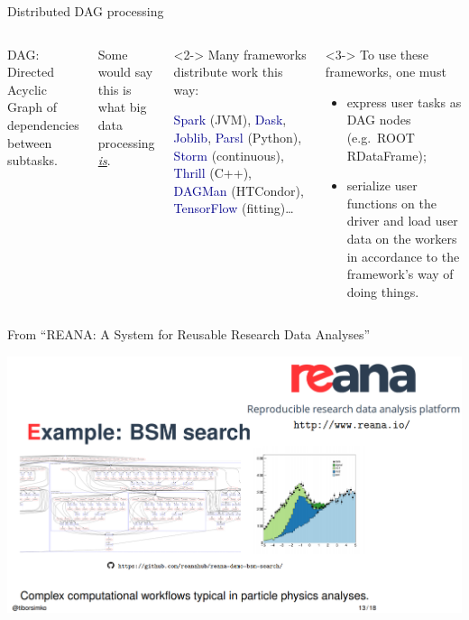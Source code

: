 \documentclass[aspectratio=169]{beamer}
\begin{document}
\begin{frame}{Distributed DAG processing}
\begin{columns}
DAG: Directed Acyclic Graph of dependencies between subtasks.

Some would say this is what big data processing \underline{\it is}.

\vspace{0.5 cm}
\begin{uncoverenv}<2->
Many frameworks distribute work this way:

\vspace{0.2 cm}
\hfill \begin{minipage}{0.95\linewidth}
\textcolor{darkblue}{Spark} (JVM), \textcolor{darkblue}{Dask}, \textcolor{darkblue}{Joblib}, \textcolor{darkblue}{Parsl} (Python), \textcolor{darkblue}{Storm} (continuous), \textcolor{darkblue}{Thrill} (C++), \textcolor{darkblue}{DAGMan} (HTCondor), \textcolor{darkblue}{TensorFlow} (fitting)\ldots
\end{minipage}
\end{uncoverenv}

\vspace{0.5 cm}
\begin{uncoverenv}<3->
To use these frameworks, one must
\begin{itemize}
\item express user tasks as DAG nodes (e.g.\ ROOT RDataFrame);
\item serialize user functions on the driver and load user data on the workers in accordance to the framework's way of doing things.
\end{itemize}
\end{uncoverenv}
\end{columns}
\end{frame}

\begin{frame}{From ``REANA: A System for Reusable Research Data Analyses''}
\begin{center}
\includegraphics[width=\linewidth]{reana.png}
\end{center}
\end{frame}
\end{document}
